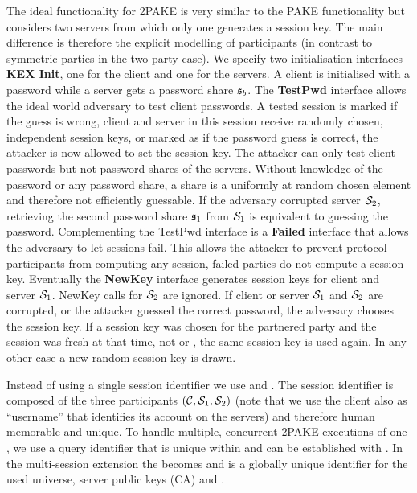 The ideal functionality for \ac{2PAKE} is very similar to the \ac{PAKE} functionality but considers two servers from which only one generates a session key.
The main difference is therefore the explicit modelling of participants (in contrast to symmetric parties in the two-party case).
We specify two initialisation interfaces \textbf{KEX Init}, one for the client and one for the servers.
A client is initialised with a password \pwd while a server gets a password share $\mathfrak{s}_b$.
The \textbf{TestPwd} interface allows the ideal world adversary to test client passwords.
A tested session is marked \interrupted if the guess is wrong, \ie client and server in this session receive randomly chosen, independent session keys, or marked as \compromised if the password guess is correct, \ie the attacker is now allowed to set the session key.
The attacker can only test client passwords but not password shares of the servers.
Without knowledge of the password or any password share, a share is a uniformly at random chosen element and therefore not efficiently guessable.
If the adversary corrupted server $\mathcal{S}_2$, retrieving the second password share $\mathfrak{s}_1$ from $\mathcal{S}_1$ is equivalent to guessing the password.
Complementing the TestPwd interface is a \textbf{Failed} interface that allows the adversary to let sessions fail.
This allows the attacker to prevent protocol participants from computing any session, \ie failed parties do not compute a session key.
Eventually the \textbf{NewKey} interface generates session keys for client \Client and server $\mathcal{S}_1$.
NewKey calls for $\mathcal{S}_2$ are ignored.
If client \Client or server $\mathcal{S}_1$ and $\mathcal{S}_2$ are corrupted, or the attacker guessed the correct password, the adversary chooses the session key.
If a session key was chosen for the partnered party and the session was fresh at that time, \ie not \compromised or \interrupted, the same session key is used again.
In any other case a new random session key is drawn.

Instead of using a single session identifier \sid we use \sid and \qid.
The session identifier \sid is composed of the three participants $(\mathcal{C}, \mathcal{S}_1, \mathcal{S}_2)$ (note that we use the client \Client also as ``username'' that identifies its account on the servers) and therefore human memorable and unique.
To handle multiple, concurrent \ac{2PAKE} executions of one \sid, we use a query identifier \qid that is unique within \sid and can be established with \Finit.
In the multi-session extension \FTWOPAKEM the \sid becomes \ssid and \sid is a globally unique identifier for the used universe, \ie server public keys (\ac{CA}) and \crs.


